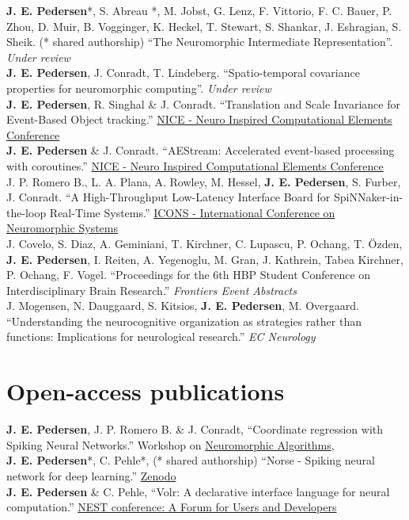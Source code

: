\documentclass[11pt, a4paper]{article}
\newcommand{\years}[1]{\marginnote{\scriptsize #1}}
\begin{document}
\years{}\textbf{J. E. Pedersen}*, S. Abreau *, M. Jobst, G. Lenz, F. Vittorio, F. C. Bauer, P. Zhou, D. Muir, B. Vogginger, K. Heckel,
T. Stewart, S. Shankar, J. Eshragian, S. Sheik. (* shared authorship) ``The Neuromorphic Intermediate Representation''. \emph{Under review} \\
\years{}\textbf{J. E. Pedersen}, J. Conradt, T. Lindeberg. ``Spatio-temporal covariance properties for neuromorphic computing''. \emph{Under review} \\
\years{2023} \textbf{J. E. Pedersen}, R. Singhal \& J. Conradt.
``Translation and Scale Invariance for Event-Based Object tracking.''
\href{https://dl.acm.org/conference/nice}{NICE - Neuro Inspired Computational Elements Conference} \\
\years{2023} \textbf{J. E. Pedersen} \& J. Conradt.
``AEStream: Accelerated event-based processing with coroutines.''
\href{https://dl.acm.org/conference/nice}{NICE - Neuro Inspired Computational Elements Conference} \\
\years{2023} J. P. Romero B., L. A. Plana, A. Rowley, M. Hessel, \textbf{J. E. Pedersen}, S. Furber, J. Conradt.
``A High-Throughput Low-Latency Interface Board for SpiNNaker-in-the-loop Real-Time Systems.''
\href{https://icons.ornl.gov/}{ICONS - International Conference on Neuromorphic Systems} \\
\years{2022} J. Covelo, S. Diaz, A. Geminiani, T. Kirchner, C. Lupascu,
P. Ochang, T. Özden, \textbf{J. E. Pedersen}, I. Reiten, A. Yegenoglu, M. Gran, J. Kathrein, Tabea Kirchner, P. Ochang, F. Vogel.
``Proceedings for the 6th HBP Student Conference on Interdisciplinary Brain Research.''
\emph{Frontiers Event Abstracts} \\
\years{2018} J. Mogensen, N. Dauggaard, S. Kitsios, \textbf{J. E. Pedersen}, M. Overgaard.
``Understanding the neurocognitive organization as strategies rather than functions: Implications for neurological research.''
\emph{EC Neurology}

\section*{Open-access publications}
\years{2022} \textbf{J. E. Pedersen}, J. P. Romero B. \& J. Conradt,
``Coordinate regression with Spiking Neural Networks.''
Workshop on \href{https://neal2022.tetzlab.com/}{Neuromorphic Algorithms}, \\
\years{2020} \textbf{J. E. Pedersen}*, C. Pehle*, (* shared authorship)
``Norse - Spiking neural network for deep learning.''
\href{https://zenodo.org/record/4422025}{Zenodo}
\\
\years{2018} \textbf{J. E. Pedersen} \& C. Pehle,
``Volr: A declarative interface language for neural computation.''
\href{https://indico-jsc.fz-juelich.de/event/71/}{NEST conference: A Forum for Users and Developers}\\
\end{document}
